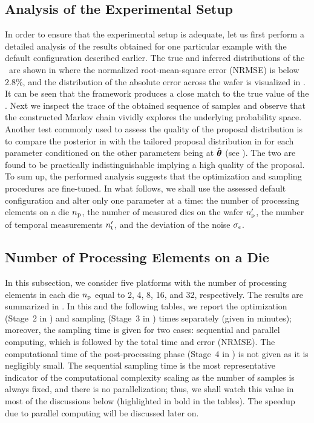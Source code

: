 \subsection{Analysis of the Experimental Setup}

In order to ensure that the experimental setup is adequate, let us first perform a detailed analysis of the results obtained for one particular example with the default configuration described earlier.
The true and inferred distributions of the \qoi\ are shown in  where the normalized root-mean-square error (NRMSE) is below $2.8\%$, and the distribution of the absolute error across the wafer is visualized in . It can be seen that the framework produces a close match to the true value of the \qoi.
Next we inspect the trace of the obtained sequence of samples and observe that the constructed Markov chain vividly explores the underlying probability space.
Another test commonly used to assess the quality of the proposal distribution is to compare the posterior in  with the tailored proposal distribution in  for each parameter conditioned on the other parameters being at $\hat{{\boldsymbol\theta}}$ (see ).
The two are found to be practically indistinguishable implying a high quality of the proposal.
To sum up, the performed analysis suggests that the optimization and sampling procedures are fine-tuned.
In what follows, we shall use the assessed default configuration and alter only one parameter at a time: the number of processing elements on a die ${n_\text{p}}$, the number of measured dies on the wafer ${n_\text{p}'}$, the number of temporal measurements ${n_\text{t}'}$, and the deviation of the noise $\sigma_\epsilon$.

\subsection{Number of Processing Elements on a Die}
In this subsection, we consider five platforms with the number of processing elements in each die ${n_\text{p}}$ equal to 2, 4, 8, 16, and 32, respectively. The results are summarized in .
In this and the following tables, we report the optimization (Stage~2 in ) and sampling (Stage~3 in ) times separately (given in minutes); moreover, the sampling time is given for two cases: sequential and parallel computing, which is followed by the total time and error (NRMSE). The computational time of the post-processing phase (Stage~4 in ) is not given as it is negligibly small.
The sequential sampling time is the most representative indicator of the computational complexity scaling as the number of samples is always fixed, and there is no parallelization; thus, we shall watch this value in most of the discussions below (highlighted in bold in the tables). The speedup due to parallel computing will be discussed later on.


